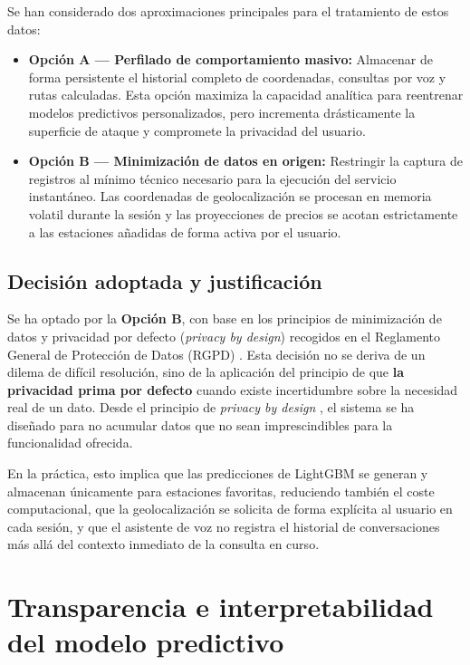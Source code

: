 Se han considerado dos aproximaciones principales para el tratamiento de estos datos:

\begin{itemize}
    \item \textbf{Opción A — Perfilado de comportamiento masivo:} Almacenar de forma persistente el historial completo de coordenadas, 
    consultas por voz y rutas calculadas. Esta opción maximiza la capacidad analítica para reentrenar modelos predictivos personalizados, 
    pero incrementa drásticamente la superficie de ataque y compromete la privacidad del usuario.
    \item \textbf{Opción B — Minimización de datos en origen:} Restringir la captura de registros al mínimo técnico necesario 
    para la ejecución del servicio instantáneo. Las coordenadas de geolocalización se procesan en memoria volatil durante la 
    sesión y las proyecciones de precios se acotan estrictamente a las estaciones añadidas de forma activa por el usuario.
\end{itemize}

\subsection{Decisión adoptada y justificación}

Se ha optado por la \textbf{Opción B}, con base en los principios de minimización de datos y privacidad por defecto (\textit{privacy by design}) 
recogidos en el Reglamento General de Protección de Datos (RGPD) \cite{rgpd2016}. 
Esta decisión no se deriva de un dilema de difícil
resolución, sino de la aplicación del principio de que \textbf{la privacidad prima por
defecto} cuando existe incertidumbre sobre la necesidad real de un dato. Desde el
principio de \textit{privacy by design} \cite{rgpd2016}, el sistema se ha diseñado para
no acumular datos que no sean imprescindibles para la funcionalidad ofrecida.

En la práctica, esto implica que las predicciones de LightGBM se generan y almacenan
únicamente para estaciones favoritas, reduciendo también el coste computacional, que
la geolocalización se solicita de forma explícita al usuario en cada sesión, y que el
asistente de voz no registra el historial de conversaciones más allá del contexto inmediato
de la consulta en curso.

\section{Transparencia e interpretabilidad del modelo predictivo}
\label{sec:etica-ia}

